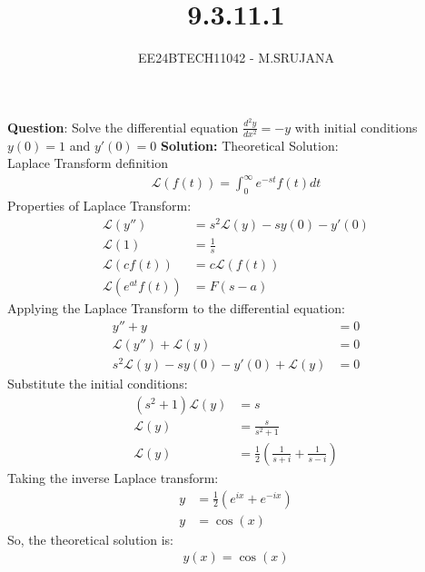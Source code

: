 \documentclass[journal]{IEEEtran}
\begin{document}

\vspace{3cm}

\title{9.3.11.1}
\author{EE24BTECH11042 - M.SRUJANA}
{\let\newpage\relax\maketitle}

\renewcommand{\thefigure}{\theenumi}
\renewcommand{\thetable}{\theenumi}
\setlength{\intextsep}{10pt} %


\renewcommand{\thetable}{\theenumi}


\textbf{Question}:\newline
Solve the differential equation $\frac{d^2y}{dx^2} = -y$ with initial conditions $y(0) = 1$ and $y'(0) = 0$
\newline
\textbf{Solution: }
\newline
Theoretical Solution:\\
Laplace Transform definition\\
\begin{align}
	\mathcal{L}(f(t)) = \int_{0}^{\infty} e^{-st} f(t) dt
\end{align}
Properties of Laplace Transform:
\begin{align}
	\mathcal{L}(y'') &= s^2 \mathcal{L}(y) - s y(0) - y'(0) \\
	\mathcal{L}(1) &= \frac{1}{s} \\
	\mathcal{L}(cf(t)) &= c \mathcal{L}(f(t)) \\
	\mathcal{L}(e^{at} f(t)) &= F(s-a)
\end{align}
Applying the Laplace Transform to the differential equation:
\begin{align}
	y'' + y &= 0 \\
	\mathcal{L}(y'') + \mathcal{L}(y) &= 0 \\
	s^2 \mathcal{L}(y) - s y(0) - y'(0) + \mathcal{L}(y) &= 0
\end{align}
Substitute the initial conditions:
\begin{align}
	(s^2 + 1)\mathcal{L}(y) &= s \\
	\mathcal{L}(y) &= \frac{s}{s^2 + 1} \\
	\mathcal{L}(y) &= \frac{1}{2}\left(\frac{1}{s + i} + \frac{1}{s - i}\right)
\end{align}
Taking the inverse Laplace transform:
\begin{align}
	y &= \frac{1}{2}\left( e^{ix} + e^{-ix} \right) \\
	y &= \cos(x)
\end{align}
So, the theoretical solution is:
\begin{align}
	y(x) = \cos(x)
\end{align}
\end{document}
